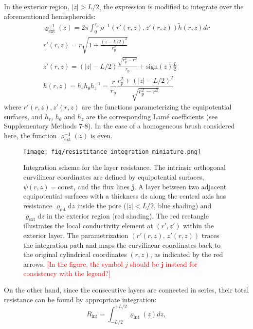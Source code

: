\documentclass[12pt, a4paper]{article}
\newcommand\todo[1]{\textcolor{red}{#1}}
\begin{document}
In the exterior region, $|z| >L/2$, the expression is modified to integrate over the aforementioned hemispheroids:
\begin{equation}
    \begin{gathered}
        \varrho_{\text{ext}}^{-1}(z)= 2\pi\int_{0}^{r_{\text{p}}^{}} \rho^{-1}\left( r'(r,z), z'(r,z) \right)  \tilde{h} (r,z) dr\\
        r'(r,z) = r\sqrt{1 + \frac{(z - L/2)^2}{r_{\text{p}}^2}}\\
        z'(r,z) = (|z| - L/2) \frac{\sqrt{r_{\text{p}}^2 - r^2}}{r_{\text{p}}} +  \text{sign}(z) \frac{L}{2}\\
        \tilde{h} (r,z) = h_r h_{\theta} h_z^{-1} = \dfrac{r}{r_{\text{p}}}\dfrac{r_{\text{p}}^2 + (|z|-L/2)^2}{\sqrt{r_{\text{p}}^2 - r^2}}
    \end{gathered}
\label{eq:varrho2}
\end{equation}
where $r'(r,z) , z'(r,z)$ are the functions parameterizing the equipotential surfaces, and $h_r$, $h_{\theta}$ and $h_z$ are the corresponding Lam\'e coefficients (see Supplementary Methods 7-8). In the case of a homogeneous brush considered here, the function $\varrho_{\text{ext}}^{-1}(z)$ is even.

\begin{figure}
    \centering
    \texttt{[image: fig/resistitance\_integration\_miniature.png]}
    \caption{
    Integration scheme for the layer resistance.  
    The intrinsic orthogonal curvilinear coordinates are defined by equipotential surfaces, $\psi(r,z)=\text{const}$, and the flux lines $\bm{j}$.  
    A layer between two adjacent equipotential surfaces with a thickness $\text{d}z$ along the central axis has resistance $\varrho_{\text{int}}\text{d}z$ inside the pore ($|z|<L/2$, blue shading) and $\varrho_{\text{ext}}\text{d}z$ in the exterior region (red shading).  
    The red rectangle illustrates the local conductivity element at $(r',z')$ within the exterior layer.  
    The parametrization $(r'(r,z),\,z'(r,z))$ traces the integration path and maps the curvilinear coordinates back to the original cylindrical coordinates $(r,z)$, as indicated by the red arrows.
    \todo{[In the figure, the symbol $j$ should be $\mathbf{j}$ instead for consistency with the legend?]}
    }
    \label{fig:integration_scheme}
\end{figure}

On the other hand, since the consecutive layers are connected in series, their total resistance can be found by appropriate integration:
\begin{equation}
    R_{\text{int}} = \int_{-L/2}^{+L/2}\varrho_{\text{int}}(z) dz,
    \label{R_int}
\end{equation}
\end{document}
